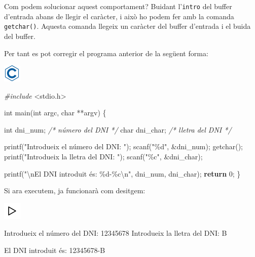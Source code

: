 \documentclass[]{book}
\newenvironment{Shaded}{\begin{snugshade}}{\end{snugshade}}
\newcommand{\CommentTok}[1]{\textcolor[rgb]{0.56,0.35,0.01}{\textit{#1}}}
\newcommand{\ControlFlowTok}[1]{\textcolor[rgb]{0.13,0.29,0.53}{\textbf{#1}}}
\newcommand{\DataTypeTok}[1]{\textcolor[rgb]{0.13,0.29,0.53}{#1}}
\newcommand{\DecValTok}[1]{\textcolor[rgb]{0.00,0.00,0.81}{#1}}
\newcommand{\ImportTok}[1]{#1}
\newcommand{\NormalTok}[1]{#1}
\newcommand{\PreprocessorTok}[1]{\textcolor[rgb]{0.56,0.35,0.01}{\textit{#1}}}
\newcommand{\SpecialCharTok}[1]{\textcolor[rgb]{0.00,0.00,0.00}{#1}}
\newcommand{\StringTok}[1]{\textcolor[rgb]{0.31,0.60,0.02}{#1}}
\begin{document}
Com podem solucionar aquest comportament? Buidant l'\texttt{intro} del buffer d'entrada abans de llegir el caràcter, i això ho podem fer amb la comanda \texttt{getchar()}. Aquesta comanda llegeix un caràcter del buffer d'entrada i el buida del buffer.

Per tant es pot corregir el programa anterior de la següent forma:

\includegraphics{./img/c.png}

\begin{Shaded}
\begin{Highlighting}[]
\PreprocessorTok{\#include }\ImportTok{\textless{}stdio.h\textgreater{}}

\DataTypeTok{int}\NormalTok{ main(}\DataTypeTok{int}\NormalTok{ argc, }\DataTypeTok{char}\NormalTok{ **argv) \{}

    \DataTypeTok{int}\NormalTok{ dni\_num;    }\CommentTok{/* número del DNI */}
    \DataTypeTok{char}\NormalTok{ dni\_char;  }\CommentTok{/* lletra del DNI */}

\NormalTok{    printf(}\StringTok{"Introdueix el número del DNI: "}\NormalTok{);}
\NormalTok{    scanf(}\StringTok{"\%d"}\NormalTok{, \&dni\_num);}
\NormalTok{    getchar();}
\NormalTok{    printf(}\StringTok{"Introdueix la lletra del DNI: "}\NormalTok{);}
\NormalTok{    scanf(}\StringTok{"\%c"}\NormalTok{, \&dni\_char);}

\NormalTok{    printf(}\StringTok{"}\SpecialCharTok{\textbackslash{}n}\StringTok{El DNI introduit és: \%d{-}\%c}\SpecialCharTok{\textbackslash{}n}\StringTok{"}\NormalTok{, dni\_num, dni\_char);}
    \ControlFlowTok{return} \DecValTok{0}\NormalTok{;}
\NormalTok{\}}
\end{Highlighting}
\end{Shaded}

Si ara executem, ja funcionarà com desitgem:

\includegraphics{./img/play.png}

\begin{Shaded}
\begin{Highlighting}[]
\NormalTok{Introdueix el número del DNI: }\DecValTok{12345678}
\NormalTok{Introdueix la lletra del DNI: B}

\NormalTok{El DNI introduit és: }\DecValTok{12345678}\NormalTok{{-}B}
\end{Highlighting}
\end{Shaded}
\end{document}
